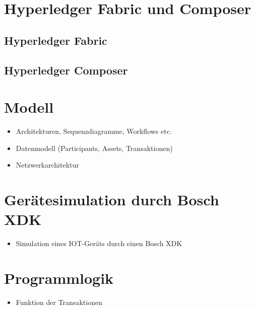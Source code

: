 \section{Hyperledger Fabric und Composer}

\subsection{Hyperledger Fabric}



\subsection{Hyperledger Composer}

\section{Modell}
\begin{itemize}
    \item Architekturen, Sequenzdiagramme, Workflows etc.
    \item Datenmodell (Participants, Assets, Transaktionen)
    \item Netzwerkarchitektur
\end{itemize}

\section{Gerätesimulation durch Bosch XDK}
\begin{itemize}
    \item Simulation eines IOT-Geräts durch einen Bosch XDK
\end{itemize}

\section{Programmlogik}
\begin{itemize}
    \item Funktion der Transaktionen
\end{itemize}

